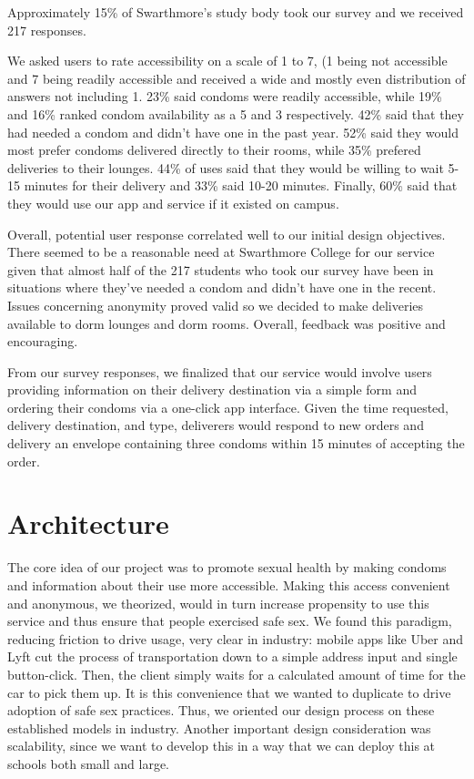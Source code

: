 \documentclass{acm_proc_article-sp}
\begin{document}
Approximately 15\% of Swarthmore's study body took our survey and we received 217 responses. 

We asked users to rate accessibility on a scale of 1 to 7, (1 being not accessible and 7 being readily accessible and received a wide and mostly even distribution of answers not including 1. 23\% said condoms were readily accessible, while 19\% and 16\% ranked condom availability as a 5 and 3 respectively. 42\% said that they had needed a condom and didn't have one in the past year. 52\% said they would most prefer condoms delivered directly to their rooms, while 35\% prefered deliveries to their lounges. 44\% of uses said that they would be willing to wait 5-15 minutes for their delivery and 33\% said 10-20 minutes. Finally, 60\% said that they would use our app and service if it existed on campus. 

Overall, potential user response correlated well to our initial design objectives. There seemed to be a reasonable need at Swarthmore College for our service given that almost half of the 217 students who took our survey have been in situations where they've needed a condom and didn't have one in the recent. Issues concerning anonymity proved valid so we decided to make deliveries available to dorm lounges and dorm rooms. Overall, feedback was positive and encouraging. 

From our survey responses, we finalized that our service would involve users providing information on their delivery destination via a simple form and ordering their condoms via a one-click app interface. Given the time requested, delivery destination, and type, deliverers would respond to new orders and delivery an envelope containing three condoms within 15 minutes of accepting the order. 


\section{Architecture}
\smallskip
The core idea of our project was to promote sexual health by making condoms and information about their use more accessible. Making this access convenient and anonymous, we theorized, would in turn increase propensity to use this service and thus ensure that people exercised safe sex. We found this paradigm, reducing friction to drive usage, very clear in industry: mobile apps like Uber and Lyft cut the process of transportation down to a simple address input and single button-click. Then, the client simply waits for a calculated amount of time for the car to pick them up. It is this convenience that we wanted to duplicate to drive adoption of safe sex practices. Thus, we oriented our design process on these established models in industry. Another important design consideration was scalability, since we want to develop this in a way that we can deploy this at schools both small and large.
\end{document}
